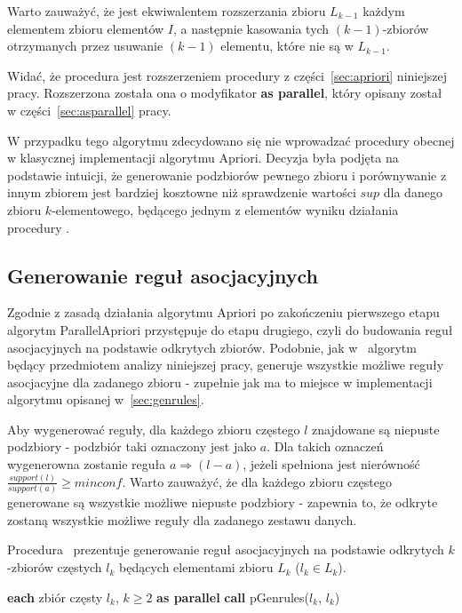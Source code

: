 Warto zauważyć, że  jest ekwiwalentem rozszerzania zbioru $L_{k-1}$ każdym elementem zbioru elementów $I$, a następnie kasowania tych $(k-1)$-zbiorów otrzymanych przez usuwanie $(k-1)$ elementu, które nie są w $L_{k-1}$. 

Widać, że procedura  jest rozszerzeniem procedury  z części~\ref{sec:apriori} niniejszej pracy. Rozszerzona została ona o modyfikator \textbf{as parallel}, który opisany został w części~\ref{sec:asparallel} pracy.

W przypadku tego algorytmu zdecydowano się nie wprowadzać procedury  obecnej w klasycznej implementacji algorytmu Apriori. Decyzja była podjęta na podstawie intuicji, że generowanie podzbiorów pewnego zbioru i porównywanie z innym zbiorem jest bardziej kosztowne niż sprawdzenie wartości $sup$ dla danego zbioru $k$-elementowego, będącego jednym z elementów wyniku działania procedury .

\subsection{Generowanie reguł asocjacyjnych}
Zgodnie z zasadą działania algorytmu Apriori po zakończeniu pierwszego etapu algorytm ParallelApriori przystępuje do etapu drugiego, czyli do budowania reguł asocjacyjnych na podstawie odkrytych zbiorów. Podobnie, jak w~\cite{Apriori:Main} algorytm będący przedmiotem analizy niniejszej pracy, generuje wszystkie możliwe reguły asocjacyjne dla zadanego zbioru - zupełnie jak ma to miejsce w implementacji algorytmu opisanej w~\ref{sec:genrules}.

Aby wygenerować reguły, dla każdego zbioru częstego $l$ znajdowane są niepuste podzbiory - podzbiór taki oznaczony jest jako $a$. Dla takich oznaczeń wygenerowna zostanie reguła $a \Rightarrow (l-a)$, jeżeli spełniona jest nierówność $\frac{support(l)}{support(a)} \geq minconf$. Warto zauważyć, że dla każdego zbioru częstego generowane są wszystkie możliwe niepuste podzbiory - zapewnia to, że odkryte zostaną wszystkie możliwe reguły dla zadanego zestawu danych.

Procedura~ prezentuje generowanie reguł asocjacyjnych na podstawie odkrytych $k$-zbiorów częstych $l_k$ będących elementami zbioru $L_k$ ($l_k \in L_k$).

\begin{codebox}
		\li \For \textbf{each} zbiór częsty $l_k$, $k \geq 2$  \textbf{as parallel}
		\li \Do
			\textbf{call} pGenrules($l_k$, $l_k$)
			\End
		\End
\end{codebox}

